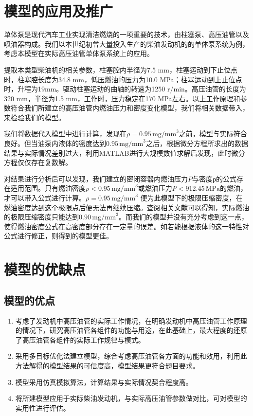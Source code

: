 \documentclass[withoutpreface,bwprint]{cumcmthesis} %
\begin{document}
\section{模型的应用及推广}


单体泵是现代汽车工业实现清洁燃烧的一项重要的技术，由柱塞泵、高压油管以及喷油器构成。我们以本世纪初曾大量投入生产的柴油发动机的的单体泵系统为例，考虑本模型在实际高压油管单体泵系统上的应用。

提取本类型柴油机的相关参数，柱塞腔内半径为7.5 mm，柱塞运动到下止位点时，柱塞腔长度为34.8 mm，低压燃油的压力为10.0 MPa；柱塞运动到上止位点时，升程为19mm。驱动柱塞运动的曲轴的转速为1250 r/min。高压油管的长度为320 mm，半径为1.5 mm，工作时，压力稳定在170 MPa左右。以上工作原理和参数符合我们所建立的高压油管内燃油压力和密度变化模型，我们将相关数据带入，来检验我们的模型。

我们将数据代入模型中进行计算，发现在$\rho=0.95\,\text{mg/mm}^{3}$之前，模型与实际符合良好。但当油泵内液体的密度达到$0.95\,\text{mg/mm}^{3}$之后，根据微分方程所求出的数据结果与实际情况差别过大，利用MATLAB进行大规模数值求解后发现，此时微分方程仅仅存在复数解。

对结果进行分析后可以发现，我们建立的密闭容器内燃油压力$P$与密度ρ的公式存在适用范围。只有燃油密度$\rho < 0.95\,\text{mg/mm}^{3}$或燃油压力$P< 912.45\,\text{MPa} $的燃油，才可以带入公式进行计算。$\rho=0.95 \,\text{mg/mm}^{3}$ 便为此模型下的极限压缩密度，在燃油密度达到这个极限点后便无法再继续压缩。查阅相关文献可以得知，实际燃油的极限压缩密度只能达到$0.90\,\text{mg/mm}^{3}$。而我们的模型并没有充分考虑到这一点，使得燃油密度公式在高密度部分存在一定量的误差。如若能根据液体的这一特性对公式进行修正，则得到的模型更佳。

\section{模型的优缺点}
\subsection{模型的优点}



\begin{enumerate}
	\item 考虑了发动机中高压油管的实际工作情况，在明确发动机中高压油管工作原理的情况下，研究高压油管各组件的功能与用途，在此基础上，最大程度的还原了高压油管各组件的实际工作规律与模式。
	\item 采用多目标优化法建立模型，综合考虑高压油管各方面的功能和效用，利用此方法解得的模型结果的可信度高，模型结果更符合题目要求。
	\item 模型采用仿真模拟算法，计算结果与实际情况契合程度高。
	\item 将所建模型应用于实际柴油发动机，与实际高压油管参数做对比，可对模型的实用性进行评估。
\end{enumerate}
\end{document}
